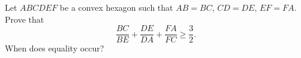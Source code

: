 Let $ABCDEF$ be a convex hexagon such that $AB = BC$, $CD = DE$, $EF = FA$. Prove that
\[ \frac{BC}{BE} + \frac{DE}{DA} + \frac{FA}{FC} \geq \frac{3}{2}. \]
When does equality occur?
